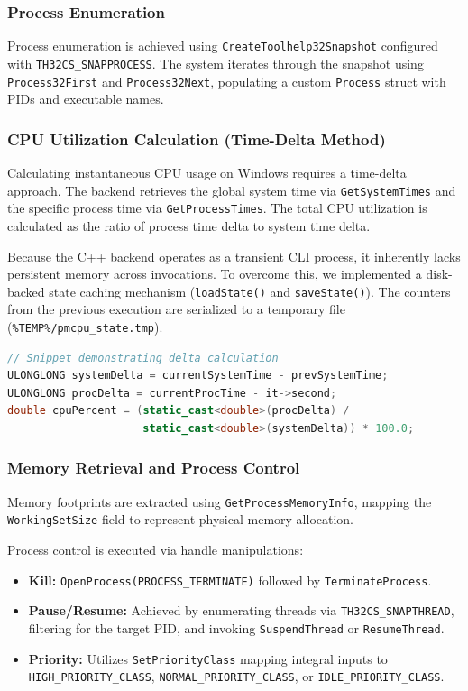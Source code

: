 \documentclass{article}
\begin{document}
\subsubsection{Process Enumeration}
Process enumeration is achieved using \texttt{CreateToolhelp32Snapshot} configured with \texttt{TH32CS\_SNAPPROCESS}. The system iterates through the snapshot using \texttt{Process32First} and \texttt{Process32Next}, populating a custom \texttt{Process} struct with PIDs and executable names.

\subsubsection{CPU Utilization Calculation (Time-Delta Method)}
Calculating instantaneous CPU usage on Windows requires a time-delta approach. The backend retrieves the global system time via \texttt{GetSystemTimes} and the specific process time via \texttt{GetProcessTimes}. The total CPU utilization is calculated as the ratio of process time delta to system time delta.

Because the C++ backend operates as a transient CLI process, it inherently lacks persistent memory across invocations. To overcome this, we implemented a disk-backed state caching mechanism (\texttt{loadState()} and \texttt{saveState()}). The counters from the previous execution are serialized to a temporary file (\texttt{\%TEMP\%/pmcpu\_state.tmp}). 

\begin{lstlisting}[language=C++]
// Snippet demonstrating delta calculation
ULONGLONG systemDelta = currentSystemTime - prevSystemTime;
ULONGLONG procDelta = currentProcTime - it->second;
double cpuPercent = (static_cast<double>(procDelta) / 
                     static_cast<double>(systemDelta)) * 100.0;
\end{lstlisting}

\subsubsection{Memory Retrieval and Process Control}
Memory footprints are extracted using \texttt{GetProcessMemoryInfo}, mapping the \texttt{WorkingSetSize} field to represent physical memory allocation.

Process control is executed via handle manipulations:
\begin{itemize}
    \item \textbf{Kill:} \texttt{OpenProcess(PROCESS\_TERMINATE)} followed by \texttt{TerminateProcess}.
    \item \textbf{Pause/Resume:} Achieved by enumerating threads via \texttt{TH32CS\_SNAPTHREAD}, filtering for the target PID, and invoking \texttt{SuspendThread} or \texttt{ResumeThread}.
    \item \textbf{Priority:} Utilizes \texttt{SetPriorityClass} mapping integral inputs to \texttt{HIGH\_PRIORITY\_CLASS}, \texttt{NORMAL\_PRIORITY\_CLASS}, or \texttt{IDLE\_PRIORITY\_CLASS}.
\end{itemize}
\end{document}
